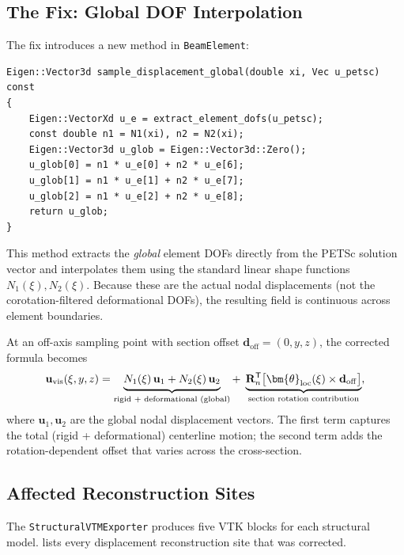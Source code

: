 \subsection{The Fix: Global DOF Interpolation}
\label{sec:global-dof-interpolation}

The fix introduces a new method in \texttt{BeamElement}:
\begin{lstlisting}
Eigen::Vector3d sample_displacement_global(double xi, Vec u_petsc) const
{
    Eigen::VectorXd u_e = extract_element_dofs(u_petsc);
    const double n1 = N1(xi), n2 = N2(xi);
    Eigen::Vector3d u_glob = Eigen::Vector3d::Zero();
    u_glob[0] = n1 * u_e[0] + n2 * u_e[6];
    u_glob[1] = n1 * u_e[1] + n2 * u_e[7];
    u_glob[2] = n1 * u_e[2] + n2 * u_e[8];
    return u_glob;
}
\end{lstlisting}

This method extracts the \emph{global} element DOFs directly from the
PETSc solution vector and interpolates them using the standard linear
shape functions $N_1(\xi), N_2(\xi)$.  Because these are the actual
nodal displacements (not the corotation-filtered deformational DOFs),
the resulting field is continuous across element boundaries.

At an off-axis sampling point with section offset
$\mathbf{d}_\mathrm{off} = (0, y, z)$, the corrected formula becomes
\begin{equation}\label{eq:new-displacement}
  \mathbf{u}_\mathrm{vis}(\xi, y, z)
  = \underbrace{N_1(\xi)\,\mathbf{u}_1 + N_2(\xi)\,\mathbf{u}_2
    \vphantom{\big|}}_{\text{rigid + deformational (global)}}
  + \;
  \underbrace{\mathbf{R}_n^{\mathsf{T}} \bigl[
      \bm{\theta}_\mathrm{loc}(\xi) \times \mathbf{d}_\mathrm{off}
    \bigr]}_{\text{section rotation contribution}},
\end{equation}
where $\mathbf{u}_1, \mathbf{u}_2$ are the global nodal displacement
vectors.  The first term captures the total (rigid + deformational)
centerline motion; the second term adds the rotation-dependent offset
that varies across the cross-section.

\subsection{Affected Reconstruction Sites}

The \texttt{StructuralVTMExporter} produces five VTK blocks for each
structural model.   lists every displacement
reconstruction site that was corrected.

